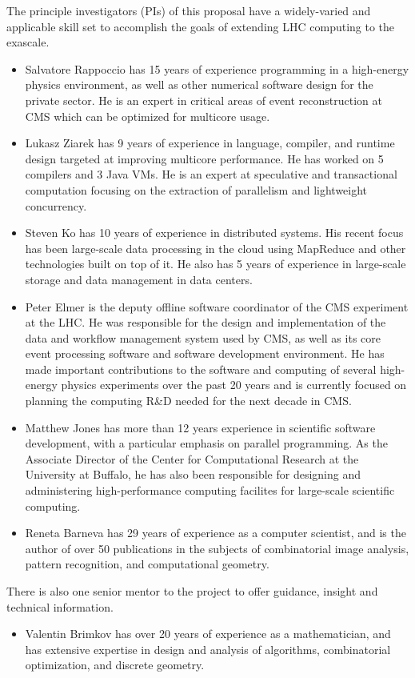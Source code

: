 \documentclass[12pt]{article}
\begin{document}
The principle investigators (PIs) of this proposal have a
widely-varied and applicable skill set to accomplish the goals of
extending LHC computing to the exascale. 

\begin{itemize}
\item Salvatore Rappoccio has 15 years of experience programming in a
high-energy physics environment, as well as other numerical software
design for the private sector. He is an expert in critical
areas of event reconstruction at CMS which can be optimized for
multicore usage. 
\item Lukasz Ziarek has 9 years of experience in language, compiler, and runtime design
targeted at improving multicore performance.  He has worked on 5 compilers and 3 Java VMs. He
is an expert at speculative and transactional computation focusing on the extraction of
parallelism and lightweight concurrency.
\item Steven Ko has 10 years of experience in distributed systems. His recent focus has been large-scale data processing in the cloud using MapReduce and other technologies built on top of it. He also has 5 years of experience in large-scale storage and data management in data centers.
\item Peter Elmer is the deputy offline software coordinator of the CMS
experiment at the LHC. He was responsible for the design and implementation
of the data and workflow management system used by CMS, as well as its core
event processing software and software development environment. He has
made important contributions to the software and computing of several 
high-energy physics experiments over the past 20 years and is currently
focused on planning the computing R\&D needed for the next decade in CMS.
\item Matthew Jones has more than 12 years experience in scientific software development, 
with a particular emphasis on parallel programming.
As the Associate Director of the Center for Computational Research at the University at Buffalo, 
he has also been responsible for designing 
and administering high-performance computing facilites for large-scale
scientific computing.
\item Reneta Barneva has 29 years of experience as a computer
  scientist, and is the author of over 50 publications in the subjects
  of combinatorial image analysis, pattern recognition, and
  computational geometry. 
\end{itemize}

There is also one senior mentor to the project to offer guidance,
insight and technical information. 
\begin{itemize}
\item Valentin Brimkov has over 20 years of experience as a
  mathematician, and has extensive expertise
  in design and analysis of algorithms, combinatorial optimization,
  and discrete geometry. 
\end{itemize}
\end{document}
